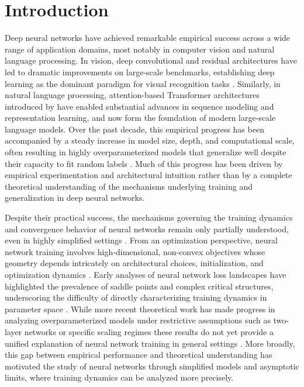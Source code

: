 \chapter{Introduction}\label{cha:intro}

Deep neural networks have achieved remarkable empirical success across a wide
range of application domains, most notably in computer vision and natural
language processing. In vision, deep convolutional and residual architectures
have led to dramatic improvements on large-scale benchmarks, establishing deep
learning as the dominant paradigm for visual recognition tasks
\citep{krizhevsky2012imagenet, he2016deep}. Similarly, in natural language
processing, attention-based Transformer architectures introduced by
\citet{vaswani2023attentionneed} have enabled substantial
advances in sequence modeling and representation learning, and now form the
foundation of modern large-scale language models. Over the past decade, this
empirical progress has been accompanied by a steady increase in model size,
depth, and computational scale, often resulting in highly overparameterized
models that generalize well despite their capacity to fit random labels
\citep{zhang2017understandingdeeplearningrequires, Belkin_2019}. Much of this
progress has been driven by empirical experimentation and architectural
intuition rather than by a complete theoretical understanding of the mechanisms
underlying training and generalization in deep neural networks.

Despite their practical success, the mechanisms governing the training dynamics
and convergence behavior of neural networks remain only partially understood,
even in highly simplified settings \citep{jacot2018ntk, Mei2018meanfieldview,
	chizat2018globalconvergencegradientdescent}. From an optimization perspective,
neural network training involves high-dimensional, non-convex objectives whose
geometry depends intricately on architectural choices, initialization, and
optimization dynamics \citep{bottou2018optimization}. Early analyses of neural
network loss landscapes have highlighted the prevalence of saddle points and
complex critical structures, underscoring the difficulty of directly
characterizing training dynamics in parameter space
\citep{choromanska2015losssurfacesmultilayernetworks}. While more recent
theoretical work has made progress in analyzing overparameterized models under
restrictive assumptions such as two-layer networks or specific scaling regimes
these results do not yet provide a unified explanation of neural network
training in general settings
\citep{du2019gradient,arora2019finegrainedanalysisoptimizationgeneralization}. More broadly,
this gap between empirical performance and theoretical understanding has
motivated the study of neural networks through simplified models and asymptotic
limits, where training dynamics can be analyzed more precisely.

